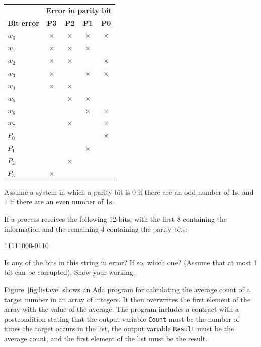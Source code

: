 \begin{center}
\begin{tabular}{lcccc}
 \toprule
     & \multicolumn{4}{l}{\textbf{Error in parity bit}}\\
     \cmidrule{2-5}
 \textbf{Bit error} & \textbf{P3} & \textbf{P2} & \textbf{P1} & \textbf{P0}\\
 \midrule
  $w_0$ & $\times$ & $\times$ & $\times$ & $\times$\\
  $w_1$ & $\times$ & $\times$ & $\times$ &         \\
  $w_2$ & $\times$ & $\times$ &          & $\times$\\
  $w_3$ & $\times$ &          & $\times$ & $\times$\\
  $w_4$ & $\times$ & $\times$ &          &         \\
  $w_5$ &          & $\times$ & $\times$ &         \\
  $w_6$ &          &          & $\times$ & $\times$\\
  $w_7$ &          & $\times$ &          & $\times$\\
  $P_0$ &          &          &          & $\times$\\
  $P_1$ &          &          & $\times$ &         \\
  $P_2$ &          & $\times$ &          &         \\
  $P_3$ & $\times$ &          &          &         \\
 \bottomrule
\end{tabular}
\end{center}

Assume a system in which a parity bit is 0 if there are an odd number of 1s, and 1 if there are an even number of 1s.

If a process receives the following 12-bits, with the first 8 containing the information and the remaining 4 containing the parity bits:
\begin{center}
   11111000-0110
\end{center}
Is any of the bits in this string in error? If so, which one? (Assume that at most 1 bit can be corrupted). Show your working.





Figure~\ref{fig:listave} shows an Ada program for calculating the average count of a target number in an array of integers.  It then overwrites the first element of the array with the value of the average. The program includes a contract with a postcondition stating that the output variable \texttt{Count} must be the number of times the target occurs in the list, the output variable \texttt{Result} must be the average count, and the first element of the list must be the result.

